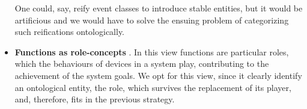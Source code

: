 \documentclass[
]{ceurart}
\begin{document}
\begin{itemize}
   One could, say, reify event classes  to introduce stable entities, but it would be artificious and we would have to solve the ensuing problem of categorizing such reifications ontologically. %
  \item \textbf{Functions as role-concepts} \cite{sasajimaFBRLFunctionBehavior1995}. In this view functions are particular roles, which the behaviours of devices in a system play, contributing to the achievement of the system goals. We opt for this view, since it clearly identify an ontological entity, the role, which survives the replacement of its player, and, therefore, fits in the previous strategy. 
\end{itemize}
\end{document}
